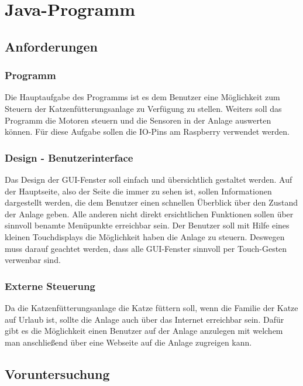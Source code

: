 \chapter{Java-Programm}
\label{sec:java-programm}

\section{Anforderungen}
\subsection{Programm}
Die Hauptaufgabe des Programms ist es dem Benutzer eine Möglichkeit zum Steuern der Katzenfütterungsanlage zu Verfügung zu stellen. Weiters soll das Programm die Motoren steuern und die Sensoren in der Anlage auswerten können. Für diese Aufgabe sollen die IO-Pins am Raspberry verwendet werden.
\subsection{Design - Benutzerinterface}
Das Design der GUI-Fenster soll einfach und übersichtlich gestaltet werden. Auf der Hauptseite, also der Seite die immer zu sehen ist, sollen Informationen dargestellt werden, die dem Benutzer einen schnellen Überblick über den Zustand der Anlage geben. Alle anderen nicht direkt ersichtlichen Funktionen sollen über sinnvoll benamte Menüpunkte erreichbar sein.
Der Benutzer soll mit Hilfe eines kleinen Touchdisplays die Möglichkeit haben die Anlage zu steuern. Deswegen muss darauf geachtet werden, dass alle GUI-Fenster sinnvoll per Touch-Gesten verwenbar sind.
\subsection{Externe Steuerung}
Da die Katzenfütterungsanlage die Katze füttern soll, wenn die Familie der Katze auf Urlaub ist, sollte die Anlage auch über das Internet erreichbar sein. Dafür gibt es die Möglichkeit einen Benutzer auf der Anlage anzulegen mit welchem man anschließend über eine Webseite auf die Anlage zugreigen kann. 

\newpage

\section{Voruntersuchung}
